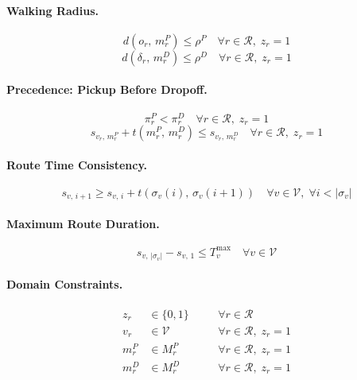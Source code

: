 \paragraph{Walking Radius.}
\begin{equation}\label{con:walk-pickup}
  d(o_r,\, m_r^P) \leq \rho^P \quad \forall r \in \mathcal{R},\; z_r = 1
\end{equation}
\begin{equation}\label{con:walk-dropoff}
  d(\delta_r,\, m_r^D) \leq \rho^D \quad \forall r \in \mathcal{R},\; z_r = 1
\end{equation}

\paragraph{Precedence: Pickup Before Dropoff.}
\begin{equation}\label{con:precedence-pos}
  \pi_r^P < \pi_r^D \quad \forall r \in \mathcal{R},\; z_r = 1
\end{equation}
\begin{equation}\label{con:precedence-time}
  s_{v_r,\, m_r^P} + t(m_r^P,\, m_r^D) \leq s_{v_r,\, m_r^D} \quad \forall r \in \mathcal{R},\; z_r = 1
\end{equation}

\paragraph{Route Time Consistency.}
\begin{equation}\label{con:time-consistency}
  s_{v,\, i+1} \geq s_{v,\, i} + t(\sigma_v(i),\, \sigma_v(i+1))
  \quad \forall v \in \mathcal{V},\; \forall i < |\sigma_v|
\end{equation}

\paragraph{Maximum Route Duration.}
\begin{equation}\label{con:route-duration}
  s_{v,\, |\sigma_v|} - s_{v,\, 1} \leq T_v^{\max} \quad \forall v \in \mathcal{V}
\end{equation}

\paragraph{Domain Constraints.}
\begin{align}
  z_r &\in \{0,1\} \quad &&\forall r \in \mathcal{R} \label{con:binary-z}\\
  v_r &\in \mathcal{V} \quad &&\forall r \in \mathcal{R},\; z_r = 1 \label{con:domain-v}\\
  m_r^P &\in M_r^P \quad &&\forall r \in \mathcal{R},\; z_r = 1 \label{con:domain-mp}\\
  m_r^D &\in M_r^D \quad &&\forall r \in \mathcal{R},\; z_r = 1 \label{con:domain-md}
\end{align}

